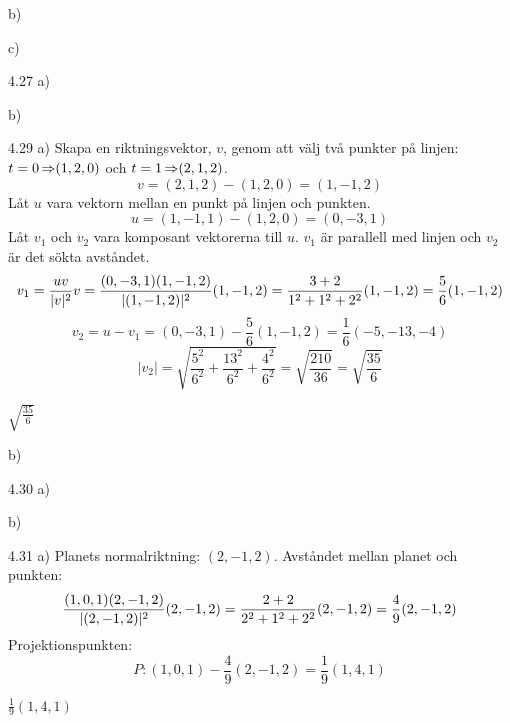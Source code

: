 \begin{task}{b)}
	\ans
\end{task}

\begin{task}{c)}
	\ans
\end{task}

\begin{task}{4.26}
	\ans
\end{task}

\begin{task}{4.27 a)}
	\ans
\end{task}

\begin{task}{b)}
	\ans
\end{task}

\begin{task}{4.28}
	\ans
\end{task}

\begin{task}{4.29 a)}
	Skapa en riktningsvektor, $v$, genom att välj två punkter på linjen: $t=0 \operatorname{\Rightarrow} (1,2,0)$ och $t=1 \operatorname{\Rightarrow} (2,1,2)$.
	\[v=(2,1,2)-(1,2,0)=(1,-1,2)\]
	Låt $u$ vara vektorn mellan en punkt på linjen och punkten.
	\[u=(1,-1,1)-(1,2,0)=(0,-3,1)\]
	Låt $v_1$ och $v_2$ vara komposant vektorerna till $u$. $v_1$ är parallell med linjen och $v_2$ är det sökta avståndet.
	\[v_1=\frac{u\*v}{|v|^2}v=
	\frac{(0,-3,1)\*(1,-1,2)}{|(1,-1,2)|^2}(1,-1,2)=
	\frac{3+2}{1^2+1^2+2^2}(1,-1,2)=
	\frac{5}{6}(1,-1,2)\]
	\[v_2=u-v_1=
	(0,-3,1)-\frac{5}{6}(1,-1,2)=
	\frac{1}{6}(-5,-13,-4)\]
	\[|v_2|=\sqrt{\frac{5^2}{6^2}+\frac{13^2}{6^2}+\frac{4^2}{6^2}}=
	\sqrt{\frac{210}{36}}=
	\sqrt{\frac{35}{6}}\]

	\ans $\sqrt{\frac{35}{6}}$
\end{task}

\begin{task}{b)}
	\ans
\end{task}

\begin{task}{4.30 a)}
	\ans
\end{task}

\begin{task}{b)}
	\ans
\end{task}

\begin{task}{4.31 a)}
	Planets normalriktning: $(2,-1,2)$.
	Avståndet mellan planet och punkten:
	\[\frac{(1,0,1)\*(2,-1,2)}{|(2,-1,2)|^2}(2,-1,2)=
	\frac{2+2}{2^2+1^2+2^2}(2,-1,2)=
	\frac{4}{9}(2,-1,2)\]
	Projektionspunkten:
	\[P:(1,0,1)-\frac{4}{9}(2,-1,2)=\frac{1}{9}(1,4,1)\]

	\ans $\frac{1}{9}(1,4,1)$
\end{task}

